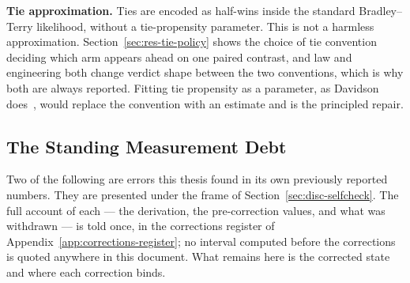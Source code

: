 \textbf{Tie approximation.}
Ties are encoded as half-wins inside the standard Bradley--Terry
likelihood, without a tie-propensity parameter. This is not a harmless
approximation. Section~\ref{sec:res-tie-policy} shows the choice of tie
convention deciding which arm appears ahead on one paired contrast, and
law and engineering both change verdict shape between the two
conventions, which is why both are always reported. Fitting tie
propensity as a parameter, as Davidson
does~\parencite{davidson1970ties}, would replace the convention with an
estimate and is the principled repair.

\subsection{The Standing Measurement Debt}\label{sec:disc-debt}

Two of the following are errors this thesis found in its own
previously reported numbers. They are presented under the frame of
Section~\ref{sec:disc-selfcheck}. The full
account of each --- the derivation, the pre-correction values, and
what was withdrawn --- is told once, in the corrections register of
Appendix~\ref{app:corrections-register}; no interval computed before
the corrections is quoted anywhere in this document. What remains here
is the corrected state and where each correction binds.

